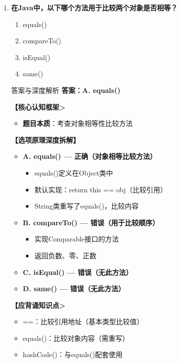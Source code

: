 \documentclass[12pt, a4paper]{ctexart}
\begin{document}
\begin{enumerate}[label=\textbf{\arabic*.}]
	      \vspace{1em}

	\item \textbf{在Java中，以下哪个方法用于比较两个对象是否相等？}
	      \begin{enumerate}[label=\Alph*.]
		      \item equals()
		      \item compareTo()
		      \item isEqual()
		      \item same()
	      \end{enumerate}

	      \begin{bluebox}{答案与深度解析}
		      \textbf{答案：A. equals()}

		      \textbf{【核心认知框架>}
		      \begin{itemize}[leftmargin=*, nosep, label={}]
			      \item \textbf{题目本质}：考查对象相等性比较方法
		      \end{itemize}

		      \textbf{【选项原理深度拆解】}
		      \begin{itemize}[label={}, nosep]
			      \item \textbf{A. equals() — 正确（对象相等比较方法）}
			      \begin{itemize}[label={}, nosep]
				      \item equals()定义在Object类中
				      \item 默认实现：return this == obj（比较引用）
				      \item String类重写了equals()，比较内容
			      \end{itemize}
			      \item \textbf{B. compareTo() — 错误（用于比较顺序）}
			      \begin{itemize}[label={}, nosep]
				      \item 实现Comparable接口的方法
				      \item 返回负数、零、正数
			      \end{itemize}
			      \item \textbf{C. isEqual() — 错误（无此方法）}
			      \item \textbf{D. same() — 错误（无此方法）}
		      \end{itemize}

		      \textbf{【应背诵知识点>}
		      \begin{itemize}[label={}, nosep]
			      \item ==：比较引用地址（基本类型比较值）
			      \item equals()：比较对象内容（需重写）
			      \item hashCode()：与equals()配套使用
		      \end{itemize}
	      \end{bluebox}


\end{enumerate}
\end{document}
